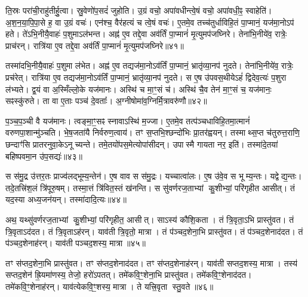 ति॒स्रः परा॑ची॒राहु॑तीर्\mbox{}हु॒त्वा।
स्रु॒वेणो॑प॒सदं॑ जुहोति।
उ॒ग्रं वचो॒ अपा॑वधीन्त्वे॒षं वचो॒ अपा॑वधी॒ꣴ॒ स्वाहेति॑।
अ॒श॒न॒या॒पि॒पा॒से ह॒ वा उ॒ग्रं वचः॑।
एन॑श्च॒ वैर॑हत्यं च त्वे॒षं वचः॑।
ए॒तमे॒व तच्च॑तुर्धाविहि॒तं पा॒प्मानं॒ यज॑मा॒नोऽप॑ हते।
ते॑ऽभि॒नीयै॒वाहः॑ प॒शुमा\-ऽल॑भन्त।
अह्न॑ ए॒व तद्दे॒वा अव॑र्तिं पा॒प्मानं॑ मृ॒त्युमप॑जघ्निरे।
तेना॑भि॒नीये॑व॒ रात्रेः॒ प्राच॑रन्।
रात्रि॑या ए॒व तद्दे॒वा अव॑र्तिं पा॒प्मानं॑ मृ॒त्युमप॑जघ्निरे॥४१॥

तस्मा॑दभि॒नीयै॒वाहः॑ प॒शुमा ल॑भेत।
अह्न॑ ए॒व तद्यज॑मा॒नो\-ऽव॑र्तिं पा॒प्मानं॒ भ्रातृ॑व्या॒नप॑ नुदते।
तेना॑भि॒नीये॑व॒ रात्रेः॒ प्रच॑रेत्।
रात्रि॑या ए॒व तद्यज॑मा॒नो\-ऽव॑र्तिं पा॒प्मानं॒ भ्रातृ॑व्या॒नप॑ नुदते।
स ए॒ष उ॑पवस॒थीयेऽहं॑ द्विदेव॒त्यः॑ प॒शुरा ल॑भ्यते।
द्व॒यं वा अ॒स्मिँल्लो॒के यज॑मानः।
अस्थि॑ च मा॒ꣳ॒सं च॑।
अस्थि॑ चै॒व तेन॑ मा॒ꣳ॒सं च॒ यज॑मानः॒ सꣴस्कु॑रुते।
ता वा ए॒ताः पञ्च॑ दे॒वताः᳚।
अ॒ग्नीषोमा॑व॒ग्निर्मि॒त्रावरु॑णौ॥४२॥

प॒ञ्च॒प॒ञ्ची वै यज॑मानः।
त्वङ्मा॒ꣳ॒सꣴ स्नावा\-ऽस्थि॑ म॒ज्जा।
ए॒तमे॒व तत्प॑ञ्चधाविहि॒तमा॒त्मानं॑ वरुणपा॒शान्मु॑ञ्चति।
भे॒ष॒जता॑यै निर्वरुण॒त्वाय॑।
तꣳ स॒प्तभि॒श्छन्दो॑भिः प्रा॒तर॑ह्वयन्।
तस्माथ्स॒प्त च॑तुरुत्त॒राणि॒ छन्दाꣳ॑सि प्रातरनुवा॒के\-ऽनूच्यन्ते।
तमे॒तयो॑पस॒मेत्योपा॑सीदन्।
उपास्मै गायता नर॒ इति॑।
तस्मा॑दे॒तया॑ बहिष्पवमा॒न उ॑प॒सद्यः॑॥४३॥\anuvakamend[ऐ॒च्छ॒न्न॒न॒य॒ꣴ॒स्ति॒ष्ठ॒न्ते॒\-ऽनूच्या॒नूच्य॑ स्रु॒वेणा॑घा॒रमा॒घार्य॒ रात्रि॑या ए॒व तद्दे॒वा अव॑र्तिं पा॒प्मानं॑ मृ॒त्युमप॑जघ्निरे मि॒त्रावरु॑णौ॒ नव॑ च (दे॒वा यज॑मानो दे॒वा दे॒वा यज॑मानो॒ यज॑मानः॒ प्राच॑रं॒ प्रच॑रे॒दाल॑भ॒न्ताल॑भेत मृ॒त्युमप॑जघ्निरे॒ भ्रातृ॑व्यान्॥)]

स स॑मु॒द्र उ॑त्तर॒तः प्राज्व॑लद्भूम्य॒न्तेन॑।
ए॒ष वाव स स॑मु॒द्रः।
यच्चात्वा॑लः।
ए॒ष उ॑वे॒व स भूम्य॒न्तः।
यद्वेद्य॒न्तः।
तदे॒तत्त्रि॑श॒लं त्रि॑पूरु॒षम्।
तस्मा॒त्तं त्रि॑वित॒स्तं ख॑नन्ति।
स सु॑वर्णरज॒ताभ्यां कु॒शीभ्यां॒ परि॑गृहीत आसीत्।
तं यद॒स्या अध्य॒जन॑यन्।
तस्मा॑दादि॒त्यः॥४४॥

अथ॒ यथ्सु॑वर्णरज॒ताभ्यां कु॒शीभ्यां॒ परि॑गृहीत॒ आसीत्।
साऽस्य॑ कौशि॒कता।
तं त्रि॒वृता॒ऽभि प्रास्तु॑वत।
तं त्रि॒वृता\-ऽद॑दत।
तं त्रि॒वृता\-ऽह॑रन्।
याव॑ती त्रि॒वृतो॒ मात्रा।
तं प॑ञ्चद॒शेना॒भि प्रास्तु॑वत।
तं प॑ञ्चद॒शेनाद॑दत।
तं प॑ञ्चद॒शेनाह॑रन्।
याव॑ती पञ्चद॒शस्य॒ मात्रा॥४५॥

तꣳ स॑प्तद॒शेना॒भि प्रास्तु॑वत।
तꣳ स॑प्तद॒शेनाद॑दत।
तꣳ स॑प्तद॒शेनाह॑रन्।
याव॑ती सप्तद॒शस्य॒ मात्रा।
तस्य॑ सप्तद॒शेन॑ ह्रि॒यमा॑णस्य॒ तेजो॒ हरो॑\-ऽपतत्।
तमे॑कवि॒ꣳ॒शेना॒भि प्रास्तु॑वत।
तमे॑कवि॒ꣳ॒शेनाद॑दत।
तमे॑कवि॒ꣳ॒शेनाह॑रन्।
याव॑त्येकवि॒ꣳ॒शस्य॒ मात्रा।
ते यत्त्रि॒वृता स्तु॒वते॥४६॥

